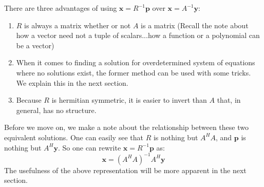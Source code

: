 There are three advantages of using \(\mathbf{x} = R^{-1}\mathbf{p}\) over \(\mathbf{x} = A^{-1}\mathbf{y}\):
	\begin{enumerate}
	\item \(R\) is always a matrix whether or not \(A\) is a matrix (Recall the note about how a vector need not a tuple of scalars...how a function or a polynomial can be a vector)
	\item When it comes to finding a solution for overdetermined system of equations where no solutions exist, the former method can be used with some tricks. We explain this in the next section.
	\item Because \(R\) is hermitian symmetric, it is easier to invert than \(A\) that, in general, has no structure.    
	\end{enumerate}
Before we move on, we make a note about the relationship between these two equivalent solutions. One can easily see that \(R\) is nothing but \(A^H A\), and \(\mathbf{p}\) is nothing but \(A^H \mathbf{y}\). So one can rewrite \(\mathbf{x} = R^{-1}\mathbf{p}\) as:
	\[ \mathbf{x} = (A^H A)^{-1} A^H \mathbf{y} \]
The usefulness of the above representation will be more apparent in the next section.

